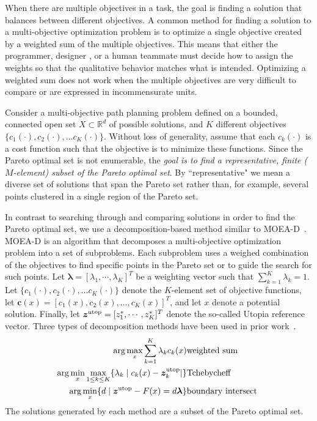 \documentclass[phd]{byuprop}
\begin{document}
When there are multiple objectives in a task, the goal is finding a solution that balances between different objectives.
A common method for finding a solution to a multi-objective optimization problem is to optimize a single objective created by a weighted sum of the multiple objectives.
This means that either the programmer, designer , or a human teammate must decide how to assign the weights so that the qualitative behavior matches what is intended. 
Optimizing a weighted sum does not work when the multiple objectives are very difficult to compare or are expressed in incommensurate units.

Consider a multi-objective path planning problem defined on a bounded, connected open set $X\subset\mathbb{R}^d$ of possible solutions, and $K$ different objectives $\{c_{1}(\cdot), c_{2}(\cdot), ... c_{K}(\cdot)\}$. 
Without loss of generality, assume that each $c_{k}(\cdot)$ is a cost function such that the objective is to minimize these functions.  
Since the Pareto optimal set is not enumerable, the {\em goal is to find a representative, finite ($M$-element) subset of the Pareto optimal set}.  
By ``representative" we mean a diverse set of solutions that span the Pareto set rather than, for example, several points clustered in a single region of the Pareto set.

In contrast to searching through and comparing solutions in order to find the Pareto optimal set, we use a decomposition-based method similar to MOEA-D~\cite{Zhang2007}.  
MOEA-D is an algorithm that decomposes a multi-objective optimization problem into a set of subproblems.  
Each subproblem uses a weighed combination of the objectives to find specific points in the Pareto set or to guide the search for such points.  
Let $ \bm{\lambda} = [ \lambda_{1} , \cdots , \lambda_{K}  ]^{T} $ be a weighting vector such that $ \sum_{k=1}^{K} \lambda_{k} = 1 $.  
Let $\{c_{1}(\cdot), c_{2}(\cdot), \ldots c_{K}(\cdot)\}$ denote the $K$-element set of objective functions, let $\bm{c}(x) = [c_{1}(x), c_{2}(x), \ldots, c_{K}(x)]^T$, and let $x$ denote a potential solution.  
Finally, let $ \bm{z}^{\rm utop} = [z^{*}_{1}, \cdots , z^{*}_{K}]^{T} $ denote the so-called Utopia reference vector. %
Three types of decomposition methods have been used in prior work~\cite{Zhang2007}.
\begin{eqnarray}
 \arg\max_x \sum_{k=1}^{K} \lambda_{k} c_{k} (x) & {\rm weighted \ sum} \label{eq:weighted}\\
 \arg\min_x\max_{1 \leq k \leq K}  \{ \lambda_{k} \mid c_{k}(x) - \bm{z}^{\rm utop}_{k}  | \} & {\rm Tchebycheff} \label{eq:Tchebycheff}\\
 \arg\min_x \{ d \mid \bm{z}^{\rm utop} - F(x) = d \bm{\lambda} \} & {\rm boundary \ intersect\ } \label{eq:boundary}
\end{eqnarray}
The solutions generated by each method are a subset of the Pareto optimal set.
\end{document}
